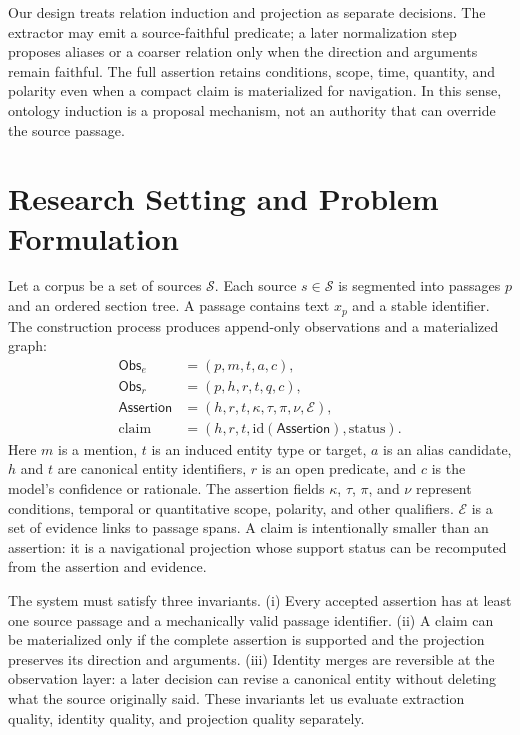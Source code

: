\documentclass[11pt]{article}
\newcommand{\obs}{\mathsf{Obs}}
\newcommand{\assertion}{\mathsf{Assertion}}
\begin{document}
Our design treats relation induction and projection as separate decisions. The extractor may emit a source-faithful predicate; a later normalization step proposes aliases or a coarser relation only when the direction and arguments remain faithful. The full assertion retains conditions, scope, time, quantity, and polarity even when a compact claim is materialized for navigation. In this sense, ontology induction is a proposal mechanism, not an authority that can override the source passage.

\section{Research Setting and Problem Formulation}
\label{sec:formulation}

Let a corpus be a set of sources $\mathcal{S}$. Each source $s\in\mathcal{S}$ is segmented into passages $p$ and an ordered section tree. A passage contains text $x_p$ and a stable identifier. The construction process produces append-only observations and a materialized graph:
\begin{align}
  \obs_e &= (p, m, t, a, c),\\
  \obs_r &= (p, h, r, t, q, c),\\
  \assertion &= (h,r,t,\kappa,\tau,\pi,\nu,\mathcal{E}),\\
  \mathrm{claim} &= (h,r,t,\mathrm{id}(\assertion),\mathrm{status}).
\end{align}
Here $m$ is a mention, $t$ is an induced entity type or target, $a$ is an alias candidate, $h$ and $t$ are canonical entity identifiers, $r$ is an open predicate, and $c$ is the model's confidence or rationale. The assertion fields $\kappa$, $\tau$, $\pi$, and $\nu$ represent conditions, temporal or quantitative scope, polarity, and other qualifiers. $\mathcal{E}$ is a set of evidence links to passage spans. A claim is intentionally smaller than an assertion: it is a navigational projection whose support status can be recomputed from the assertion and evidence.

The system must satisfy three invariants. (i) Every accepted assertion has at least one source passage and a mechanically valid passage identifier. (ii) A claim can be materialized only if the complete assertion is supported and the projection preserves its direction and arguments. (iii) Identity merges are reversible at the observation layer: a later decision can revise a canonical entity without deleting what the source originally said. These invariants let us evaluate extraction quality, identity quality, and projection quality separately.
\end{document}

